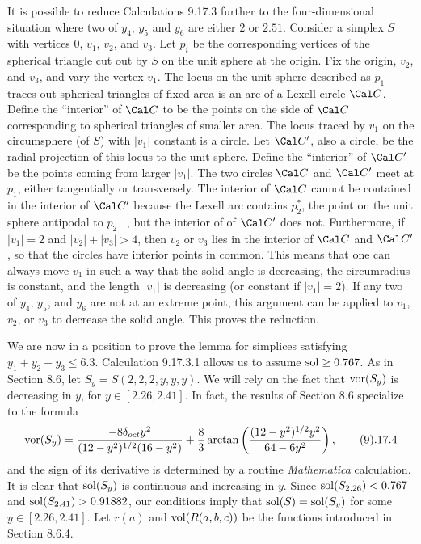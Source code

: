 It is possible to reduce Calculations 9.17.3 further to the
four-dimensional
situation where two of $y_4$, $y_5$ and $y_6$ are either $2$
or $2.51$.  Consider a simplex $S$ with vertices $0$, $v_1$,
$v_2$, and $v_3$.  Let $p_i$ be the corresponding vertices of
the spherical triangle cut out by $S$ on the unit sphere at the
origin.  Fix the origin, $v_2$, and $v_3$, and vary the vertex $v_1$.
The locus on the unit sphere described as $p_1$
traces out spherical triangles of fixed area is an arc of a
Lexell circle $\Cal C$.  Define the ``interior'' of ${\Cal C}$
to be the points on the side
of $\Cal C$ corresponding to spherical
triangles of smaller area.  The locus 
traced by $v_1$ on the circumsphere (of $S$)
with $|v_1|$ constant
is a circle.
Let ${\Cal C'}$, also a circle, be the radial projection 
of this locus to the unit
sphere.  Define the ``interior'' of $\Cal C'$ be the points coming
from larger $|v_1|$.  The two circles $\Cal C$ and $\Cal C'$
meet at $p_1$, either tangentially or transversely.  The interior
of $\Cal C$ cannot be contained in the interior of $\Cal C'$
because the Lexell arc contains $p_2^*$, the point on the unit
sphere antipodal to $p_2$
\ \cite{FT,p.23}, but the interior of of $\Cal C'$ does
not.  
Furthermore, if $|v_1|=2$ and $|v_2|+|v_3|>4$, then $v_2$ or
$v_3$ lies in the interior of
${\Cal C}$ and $\Cal C'$, so that the circles
have interior points in common.
This means that one can always move $v_1$
in such a way that the solid angle is decreasing,
the circumradius is constant, and the length $|v_1|$ is decreasing
(or constant if $|v_1|=2$).
If any two of $y_4$, $y_5$, and $y_6$ are not at an extreme point,
this argument can be applied to $v_1$, $v_2$, or $v_3$ to
decrease the solid angle.  This proves the reduction.

\smallskip
We are now in a position to prove the lemma for simplices
satisfying $y_1+y_2+y_3\le 6.3$.  Calculation 9.17.3.1 allows
us to assume $\operatorname{sol}\ge 0.767$.  
As in Section 8.6, let $S_y = S(2,2,2,y,y,y)$.
We will rely on the fact that  $\operatorname{vor}(S_y)$ is decreasing in 
$y$, for $y\in [2.26,2.41]$.
In fact, the results of Section 8.6 specialize to the formula
$$\vor(S_y) = {-8\doct y^2\over (12-y^2)^{1/2}(16-y^2)} +
{8\over 3} \arctan\left( {(12-y^2)^{1/2}y^2\over 64-6 y^2}\right),
\tag 9.17.4$$
and the sign of its derivative is determined
by a routine {\it Mathematica\/} calculation.
It is clear that $\operatorname{sol}(S_y)$
is continuous and increasing in $y$.  Since $\operatorname{sol}(S_{2.26})< 0.767$ and
$\operatorname{sol}(S_{2.41})> 0.91882$, our conditions imply that $\operatorname{sol}(S)=
\operatorname{sol}(S_y)$ for some $y\in [2.26,2.41]$.
Let $r(a)$  and $\hbox{vol}(R(a,b,c))$ be the functions introduced in
Section 8.6.4.

